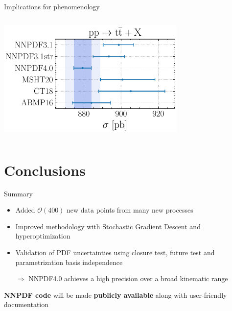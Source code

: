 \documentclass[aspectratio=169,9pt]{beamer}
\begin{document}
\begin{frame}[t]{Implications for phenomenology}
\begin{center}
\begin{columns}
\begin{column}{0.48\textwidth}
        	        \includegraphics[width=0.7\textwidth]{NNPDF_TTB_14TEV_40_PHENO-integrated}
	        \end{column}
        \end{columns}
    \end{center}
\end{frame}





\section*{Conclusions}



\begin{frame}[t]{Summary}
    \begin{itemize}
        \item Added $\mathcal{O}(400)$ new data points from many new processes
        \item Improved methodology with Stochastic Gradient Descent and hyperoptimization
        \item Validation of PDF uncertainties using closure test, future test and parametrization basis independence
        \item[$\Rightarrow$] NNPDF4.0 achieves a high precision over a broad kinematic range
    \end{itemize}
    \vspace*{2em}
    \begin{block}{}
        \centering
        {\bf NNPDF code} will be made {\bf publicly available} along with user-friendly documentation
    \end{block}
    \vspace*{2em}
\end{frame}



\end{document}
